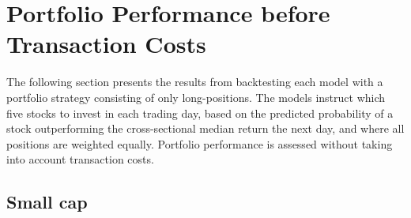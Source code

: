 \section{Portfolio Performance before Transaction Costs}
The following section presents the results from backtesting each model with a portfolio strategy consisting of only long-positions. The models instruct which five stocks to invest in each trading day, based on the predicted probability of a stock outperforming the cross-sectional median return the next day, and where all positions are weighted equally. Portfolio performance is assessed without taking into account transaction costs.    

\subsection{Small cap}
\begin{table}[ht]
\centering
{}
\caption{Small cap trading performance (long, K=5)}
\end{table}

